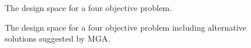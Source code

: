 \begin{figure}[h]
  \centering
  \resizebox{\columnwidth}{!}{}
  \caption{The design space for a four objective problem.}
  \label{fig:4-obj-design}
\end{figure}


\begin{figure}[h]
  \centering
  \resizebox{\columnwidth}{!}{}
  \caption{The design space for a four objective problem including alternative solutions suggested by MGA.}
  \label{fig:4-obj-design-mga}
\end{figure}